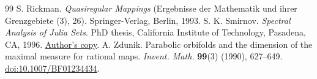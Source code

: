 \documentclass[10pt,a4paper]{amsart}
\numberwithin{equation}{section}
\begin{document}
\begin{thebibliography}{99}
 S. Rickman. \emph{Quasiregular Mappings} (Ergebnisse der Mathematik und ihrer Grenzgebiete (3), 26). Springer-Verlag, Berlin, 1993.
 S. K. Smirnov. \emph{Spectral Analysis of Julia Sets}. PhD thesis, California Institute of Technology, Pasadena, CA, 1996. \href{https://www.unige.ch/~smirnov/papers/phd.pdf}{Author's copy}.
 A. Zdunik. Parabolic orbifolds and the dimension of the maximal measure for rational maps. \emph{Invent. Math.} \textbf{99}(3) (1990), 627--649. \href{https://doi.org/10.1007/BF01234434}{doi:10.1007/BF01234434}.
\end{thebibliography}
\end{document}
